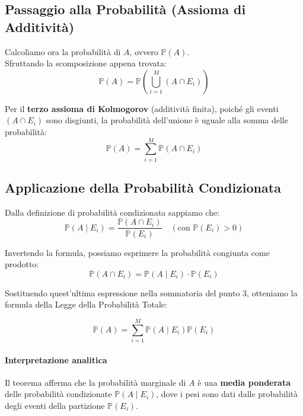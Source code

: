 \subsection{Passaggio alla Probabilità (Assioma di Additività)}

Calcoliamo ora la probabilità di $A$, ovvero $\mathbb{P}(A)$.
\\Sfruttando la scomposizione appena trovata:
\[ \mathbb{P}(A) = \mathbb{P}\left( \bigcup_{i=1}^M (A \cap E_i) \right) \]

Per il \textbf{terzo assioma di Kolmogorov} (additività finita), poiché gli eventi $(A \cap E_i)$ sono disgiunti, la probabilità dell'unione è uguale alla somma delle probabilità:
\[ \mathbb{P}(A) = \sum_{i=1}^M \mathbb{P}(A \cap E_i) \]

\subsection{Applicazione della Probabilità Condizionata}

Dalla definizione di probabilità condizionata sappiamo che:
\[ \mathbb{P}(A \mid E_i) = \frac{\mathbb{P}(A \cap E_i)}{\mathbb{P}(E_i)} \quad (\text{con } \mathbb{P}(E_i) > 0) \]

Invertendo la formula, possiamo esprimere la probabilità congiunta come prodotto:
\[ \mathbb{P}(A \cap E_i) = \mathbb{P}(A \mid E_i) \cdot \mathbb{P}(E_i) \]

Sostituendo quest'ultima espressione nella sommatoria del punto 3, otteniamo la formula della Legge della Probabilità Totale:

\begin{equation}
\boxed{\mathbb{P}(A) = \sum_{i=1}^M \mathbb{P}(A \mid E_i)\mathbb{P}(E_i)}
\end{equation}

\paragraph{Interpretazione analitica}
Il teorema afferma che la probabilità marginale di $A$ è una \textbf{media ponderata} delle probabilità condizionate $\mathbb{P}(A \mid E_i)$, dove i pesi sono dati dalle probabilità degli eventi della partizione $\mathbb{P}(E_i)$.

